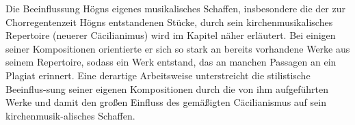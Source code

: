 Die Beeinflussung Högns eigenes musikalisches Schaffen, insbesondere die
der zur Chorregentenzeit Högns entstandenen Stücke, durch sein
kirchenmusikalisches Repertoire (neuerer Cäcilianimus) wird im Kapitel
 näher erläutert. Bei einigen seiner Kompositionen
orientierte er sich so stark an bereits vorhandene Werke aus seinem
Repertoire, sodass ein Werk entstand, das an manchen Passagen an ein
Plagiat erinnert. Eine derartige Arbeitsweise unterstreicht die
stilistische Beeinflus-sung seiner eigenen Kompositionen durch die von
ihm aufgeführten Werke und damit den großen Einfluss des gemäßigten
Cäcilianismus auf sein kirchenmusik-alisches Schaffen.
